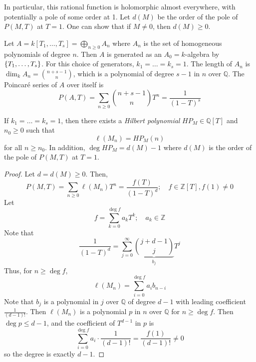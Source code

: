 In particular, this rational function is holomorphic almost everywhere, with potentially a pole of some order at 1.
Let \( d(M) \) be the order of the pole of \( P(M, T) \) at \( T = 1 \).
One can show that if \( M \neq 0 \), then \( d(M) \geq 0 \).
\begin{example}
    Let \( A = k[T_1, \dots, T_s] = \bigoplus_{n \geq 0} A_n \) where \( A_n \) is the set of homogeneous polynomials of degree \( n \).
    Then \( A \) is generated as an \( A_0 = k \)-algebra by \( \qty{T_1, \dots, T_s} \).
    For this choice of generators, \( k_1 = \dots = k_s = 1 \).
    The length of \( A_n \) is \( \dim_k A_n = \binom{n+s-1}{n} \), which is a polynomial of degree \( s - 1 \) in \( n \) over \( \mathbb Q \).
    The Poincar\'e series of \( A \) over itself is
    \[ P(A, T) = \sum_{n \geq 0} \binom{n+s-1}{n} T^n = \frac{1}{(1 - T)^s} \]
\end{example}
\begin{proposition}
    If \( k_1 = \dots = k_s = 1 \), then there exists a \emph{Hilbert polynomial} \( HP_M \in \mathbb Q[T] \) and \( n_0 \geq 0 \) such that
    \[ \ell(M_n) = HP_M(n) \]
    for all \( n \geq n_0 \).
    In addition, \( \deg HP_M = d(M) - 1 \) where \( d(M) \) is the order of the pole of \( P(M, T) \) at \( T = 1 \).
\end{proposition}
\begin{proof}
    Let \( d = d(M) \geq 0 \).
    Then,
    \[ P(M, T) = \sum_{n \geq 0} \ell(M_n) T^n = \frac{f(T)}{(1 - T)^d};\quad f \in \mathbb Z[T], f(1) \neq 0 \]
    Let
    \[ f = \sum_{k=0}^{\deg f} a_k T^k;\quad a_k \in \mathbb Z \]
    Note that
    \[ \frac{1}{(1 - T)^d} = \sum_{j=0}^\infty \underbrace{\binom{j+d-1}{j}}_{b_j} T^j \]
    Thus, for \( n \geq \deg f \),
    \[ \ell(M_n) = \sum_{i=0}^{\deg f} a_i b_{n-i} \]
    Note that \( b_j \) is a polynomial in \( j \) over \( \mathbb Q \) of degree \( d - 1 \) with leading coefficient \( \frac{1}{(d-1)!} \).
    Then \( \ell(M_n) \) is a polynomial \( p \) in \( n \) over \( \mathbb Q \) for \( n \geq \deg f \).
    Then \( \deg p \leq d - 1 \), and the coefficient of \( T^{d-1} \) in \( p \) is
    \[ \sum_{i=0}^{\deg f} a_i \cdot \frac{1}{(d-1)!} = \frac{f(1)}{(d-1)!} \neq 0 \]
    so the degree is exactly \( d - 1 \).
\end{proof}


